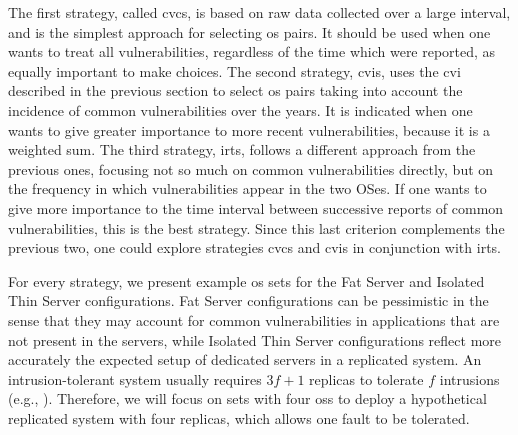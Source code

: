 The first strategy, called \gls{cvcs}, is based on raw data collected over a large interval, and is the simplest approach for selecting \gls{os} pairs. 
It should be used when one wants to treat all vulnerabilities, regardless of the time which were reported, as equally important to make choices. 
The second strategy, \gls{cvis}, uses the \gls{cvi} described in the previous section to select \gls{os} pairs taking into account the incidence of common vulnerabilities over the years. 
It is indicated when one wants to give greater importance to more recent vulnerabilities, because it is a weighted sum. 
The third strategy, \gls{irts}, follows a different approach from the previous ones, focusing not so much on common vulnerabilities directly, but on the frequency in which vulnerabilities appear in the two OSes. If one wants to give more importance to the time interval between successive reports of common vulnerabilities, this is the best strategy. 
Since this last criterion complements the previous two, one could explore strategies \gls{cvcs} and \gls{cvis} in conjunction with \gls{irts}.

For every strategy, we present example \gls{os} sets for the Fat Server and Isolated Thin Server configurations. 
Fat Server configurations can be pessimistic in the sense that they may account for common vulnerabilities in applications that are not present in the servers, while Isolated Thin Server configurations reflect more accurately the expected setup of dedicated servers in a replicated system. 
An intrusion-tolerant system usually requires $3f+1$ replicas to tolerate $f$ intrusions (e.g., \cite{Verissimo:2003,Castro:2002,Bessani:2008,Moniz:2011}). 
Therefore, we will focus on sets with four \glspl{os} to deploy a hypothetical replicated system with four replicas, which allows one fault to be tolerated.

